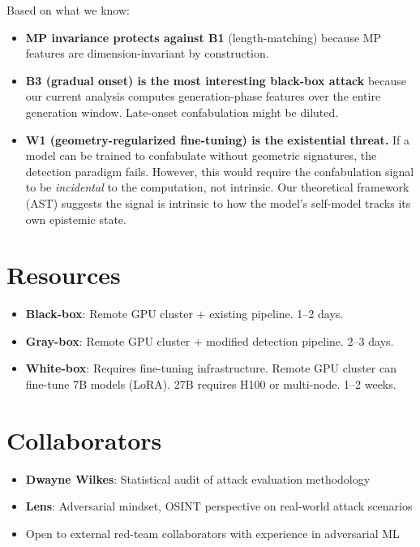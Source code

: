 \documentclass[11pt,letterpaper]{article}
\begin{document}
Based on what we know:
\begin{itemize}
  \item \textbf{MP invariance protects against B1} (length-matching)
    because MP features are dimension-invariant by construction.
  \item \textbf{B3 (gradual onset) is the most interesting
    black-box attack} because our current analysis computes
    generation-phase features over the entire generation window.
    Late-onset confabulation might be diluted.
  \item \textbf{W1 (geometry-regularized fine-tuning) is the
    existential threat.} If a model can be trained to confabulate
    without geometric signatures, the detection paradigm fails.
    However, this would require the confabulation signal to be
    \emph{incidental} to the computation, not intrinsic. Our
    theoretical framework (AST) suggests the signal is intrinsic
    to how the model's self-model tracks its own epistemic state.
\end{itemize}

\section{Resources}

\begin{itemize}
  \item \textbf{Black-box}: Remote GPU cluster + existing pipeline. 1--2 days.
  \item \textbf{Gray-box}: Remote GPU cluster + modified detection pipeline.
    2--3 days.
  \item \textbf{White-box}: Requires fine-tuning infrastructure.
    Remote GPU cluster can fine-tune 7B models (LoRA). 27B requires H100 or
    multi-node. 1--2 weeks.
\end{itemize}

\section{Collaborators}

\begin{itemize}
  \item \textbf{Dwayne Wilkes}: Statistical audit of attack
    evaluation methodology
  \item \textbf{Lens}: Adversarial mindset, OSINT perspective on
    real-world attack scenarios
  \item Open to external red-team collaborators with experience in
    adversarial ML
\end{itemize}
\end{document}
